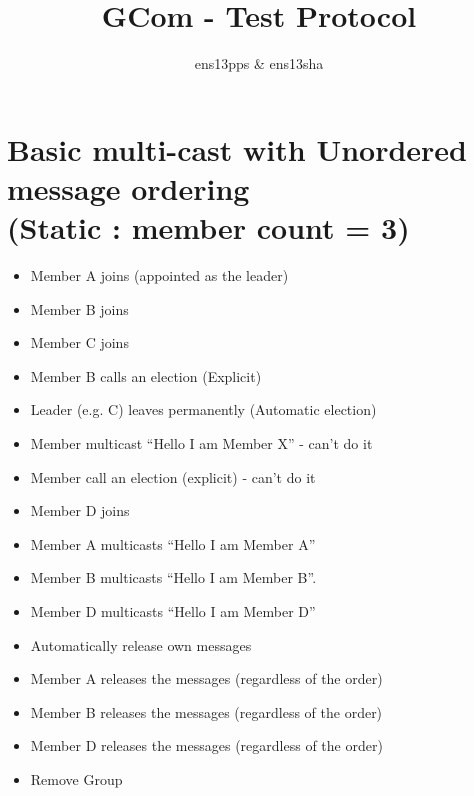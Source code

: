 \documentclass[a4,12pt]{article}
\title{GCom - Test Protocol}
\author{ens13pps \& ens13sha}
\date{}
\begin{document}
\maketitle
\section*{Basic multi-cast with Unordered message ordering\\(Static : member count = 3)}

\begin{itemize}\itemsep 5pt \parskip 2pt \parsep 2pt
\item Member A joins (appointed as the leader)
\item Member B joins
\item Member C joins
\item Member B calls an election (Explicit)
\item Leader (e.g. C) leaves permanently (Automatic election)
\item Member multicast “Hello I am Member X” - can’t do it
\item Member call an election (explicit) - can’t do it
\item Member D joins
\item Member A multicasts “Hello I am Member A”
\item Member B multicasts “Hello I am Member B”.
\item Member D multicasts “Hello I am Member D”
\item Automatically release own messages
\item Member A releases the messages (regardless of the order)
\item Member B releases the messages (regardless of the order)
\item Member D releases the messages (regardless of the order)
\item Remove Group
\end{itemize}

\newpage
\end{document}
